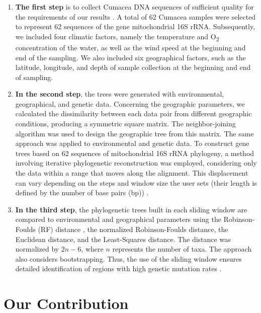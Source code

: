 \begin{enumerate}
\item \textbf{The first step} is to collect Cumacea DNA sequences of sufficient quality for the requirements of our results \citep{koshkarov_phylogeography_2022}. A total of 62 Cumacea samples were selected to represent 62 sequences of the gene mitochondrial 16S rRNA. Subsequently, we included four climatic factors, namely the temperature and O\textsubscript{2} concentration of the water, as well as the wind speed at the beginning and end of the sampling. We also included six geographical factors, such as the latitude, longitude, and depth of sample collection at the beginning and end of sampling.

\item \textbf{In the second step}, the trees were generated with environmental, geographical, and genetic data. Concerning the geographic parameters, we calculated the dissimilarity between each data pair from different geographic conditions, producing a symmetric square matrix. The neighbor-joining algorithm was used to design the geographic tree from this matrix. The same approach was applied to environmental and genetic data. To construct gene trees based on 62 sequences of mitochondrial 16S rRNA phylogeny, a method involving iterative phylogenetic reconstruction was employed, considering only the data within a range that moves along the alignment. This displacement can vary depending on the steps and window size the user sets (their length is defined by the number of base pairs (bp)) \citep{koshkarov_phylogeography_2022}.

\item \textbf{In the third step}, the phylogenetic trees built in each sliding window are compared to environmental and geographical parameters using the Robinson-Foulds (RF) distance \citep{robinson_comparison_1981, koshkarov_phylogeography_2022}, the normalized Robinson-Foulds distance, the Euclidean distance, and the Least-Squares distance. The distance was normalized by $2n-6$, where $n$ represents the number of taxa. The approach also considers bootstrapping. Thus, the use of the sliding window ensures detailed identification of regions with high genetic mutation rates \citep{koshkarov_phylogeography_2022}.
\end{enumerate}

\section{Our Contribution}

